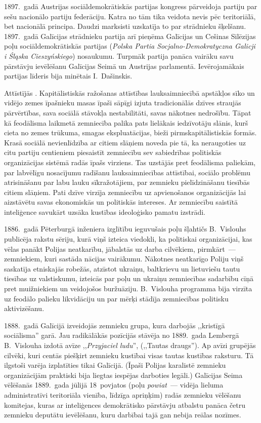 \documentclass[twoside,a5paper,12pt,fleqn,openany]{extbook}
\newcommand{\pltxti}[1]{\textit{\textpolish{#1}}}
\begin{document}
1897.~gadā Austrijas sociāldemokrātiskās partijas kongress pārveidoja partiju par sešu nacionālo partiju federāciju. Katra no tām tika veidota nevis pēc teritoriālā, bet nacionālā principa. Daudzi marksisti uzskatīja to par strādnieku šķelšanu. 1897.~gadā Galīcijas strādnieku partija arī pieņēma Galīcijas un Cešinas Silēzijas poļu sociāldemokrātiskās partijas (\pltxti{Polska Partia Socjalno-Demokratyczna Galicji i Śląska Cieszyńskiego}) nosaukumu. Turpmāk partija panāca vairāku savu pārstāvju ievēlēšanu Galīcijas Seimā un Austrijas parlamentā. Ievērojamākais partijas līderis bija minētais I.~Dašinskis.

Attīstījās . Kapitālistiskās ražošanas attīstības lauksaimniecībā apstākļos sīko un vidējo zemes īpašnieku masas īpaši sāpīgi izjuta tradicionālās dzīves straujās pārvērtības, sava sociālā stāvokļa nestabilitāti, savas nākotnes nedrošību. Tāpat kā feodālisma laikmetā zemniecība palika pats lielākais iedzīvotāju slānis, kurš cieta no zemes trūkuma, smagas ekspluatācijas, bieži pirmskapitālistiskās formās. Krasā sociālā nevienlīdzība ar citiem slāņiem noveda pie tā, ka neraugoties uz citu partiju centieniem piesaistīt zemniecību sev sabiedrības politiskās organizācijas sistēmā radās īpašs virziens. Tas uzstājās pret feodālisma paliekām, par labvēlīgu nosacījumu radīšanu lauksaimniecības attīstībai, sociālo problēmu atrisināšanu par labu lauku sīkražotājiem, par zemnieku pielīdzināšanu tiesībās citiem slāņiem. Pati dzīve virzīja zemniecību uz apvienošanos organizācijās lai aizstāvētu savas ekonomiskās un politiskās intereses. Ar zemniecību saistītā inteliģence savukārt uzsāka kustības ideoloģisko pamatu izstrādi.

1886.~gadā Pēterburgā inženiera izglītību ieguvušais poļu šļahtičs B.~Vislouhs publicēja rakstu sēriju, kurā viņš izteica viedokli, ka politiskai organizācijai, kas vēlas panākt Polijas neatkarību, jābalstās uz darba cilvēkiem, pirmkārt~--- zemniekiem, kuri sastāda nācijas vairākumu. Nākotnes neatkarīgo Poliju viņš saskatīja etniskajās robežās, atzīstot ukraiņu, baltkrievu un lietuviešu tautu tiesības uz valstiskumu, izteicās par poļu un ukraiņu zemniecības sadarbību cīņā pret muižniekiem un veidojošos buržuāziju. B.~Vislouha programma bija virzīta uz feodālo palieku likvidāciju un par mērķi stādīja zemniecības politisku aktivizēšanu.

1888.~gadā Galīcijā izveidojās zemnieku grupa, kura darbojās ,,kristīgā sociālisma'' garā. Jau radikālākās pozīcijās stāvēja no 1889.~gada Lembergā B.~Vislouha izdotā avīze ,,\pltxti{Przyjaciel ludu}'', (,,Tautas draugs''). Ap avīzi grupējās cilvēki, kuri centās piešķirt zemnieku kustībai visas tautas kustības raksturu. Tā ilgstoši varēja izplatīties tikai Galīcijā. (Īpaši Polijas karalistē zemnieku organizācijām praktiski bija liegtas iespējas darboties legāli.) Galīcijas Seima vēlēšanās 1889.~gada jūlijā 18~povjatos (poļu \pltxti{powiat}~--- vidēja lieluma administratīvi teritoriāla vienība, līdzīga apriņķim) radās zemnieku vēlēšanu komitejas, kuras ar inteliģences demokrātisko pārstāvju atbalstu panāca četru zemnieku deputātu ievēlēšanu, kuru darbībai tajā gan nebija reālas nozīmes.
\end{document}
